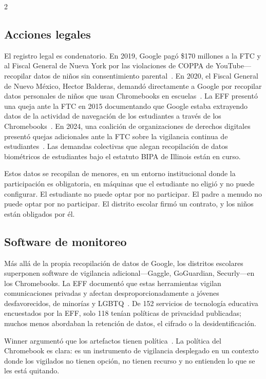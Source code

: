 \documentclass[11pt, a4paper]{article}
\begin{document}
\begin{multicols}{2}
\subsection{Acciones legales}

El registro legal es condenatorio. En 2019, Google pagó \$170 millones a la FTC y al Fiscal General de Nueva York por las violaciones de COPPA de YouTube---recopilar datos de niños sin consentimiento parental~\citep{google2019coppa}. En 2020, el Fiscal General de Nuevo México, Hector Balderas, demandó directamente a Google por recopilar datos personales de niños que usan Chromebooks en escuelas~\citep{newmexico2020google}. La EFF presentó una queja ante la FTC en 2015 documentando que Google estaba extrayendo datos de la actividad de navegación de los estudiantes a través de los Chromebooks~\citep{eff2015chromebook}. En 2024, una coalición de organizaciones de derechos digitales presentó quejas adicionales ante la FTC sobre la vigilancia continua de estudiantes~\citep{eff2024monitoring}. Las demandas colectivas que alegan recopilación de datos biométricos de estudiantes bajo el estatuto BIPA de Illinois están en curso.

Estos datos se recopilan de menores, en un entorno institucional donde la participación es obligatoria, en máquinas que el estudiante no eligió y no puede configurar. El estudiante no puede optar por no participar. El padre a menudo no puede optar por no participar. El distrito escolar firmó un contrato, y los niños están obligados por él.

\subsection{Software de monitoreo}

Más allá de la propia recopilación de datos de Google, los distritos escolares superponen software de vigilancia adicional---Gaggle, GoGuardian, Securly---en los Chromebooks. La EFF documentó que estas herramientas vigilan comunicaciones privadas y afectan desproporcionadamente a jóvenes desfavorecidos, de minorías y LGBTQ~\citep{eff2024monitoring}. De 152 servicios de tecnología educativa encuestados por la EFF, solo 118 tenían políticas de privacidad publicadas; muchos menos abordaban la retención de datos, el cifrado o la desidentificación.

Winner argumentó que los artefactos tienen política~\citep{winner1980artifacts}. La política del Chromebook es clara: es un instrumento de vigilancia desplegado en un contexto donde los vigilados no tienen opción, no tienen recurso y no entienden lo que se les está quitando.


\end{multicols}
\end{document}

